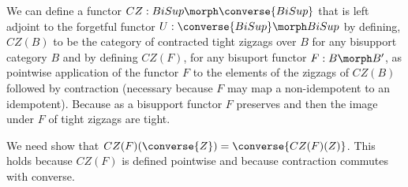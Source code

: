\newcommand{\BiSup}{BiSup}
\newcommand{\BiSupConv}{\converse{\BiSup}}

We can define a functor $CZ: \BiSup \morph \BiSupConv$ that
is left adjoint  to the forgetful functor $U: \BiSupConv \morph \BiSup$
by defining, $CZ(B)$ to be the category of contracted tight zigzags over $B$
for any bisupport category $B$ 
and by defining $CZ(F)$, for any bisuport functor $F: B \morph B'$, 
as pointwise application of the functor $F$ 
to the elements of the zigzags of $CZ(B)$ 
followed by contraction 
(necessary because $F$ may map a non-idempotent to an idempotent). 
Because as a bisupport functor $F$ preserves \rstItself and \rngItself 
then the image under $F$ of tight zigzags are tight.

We need show that $CZ(F)(\converse{Z})=\converse{CZ(F)(Z)}$. 
This holds because $CZ(F)$ is defined pointwise and because contraction
commutes with converse.

\newcommand{\funU}{\cat{U}}
\newcommand{\funUw}{\cat{U}\ }
\newcommand{\funCZ}{\cat{CZ}}
\newcommand{\funCZw}{\cat{CZ}\ }

